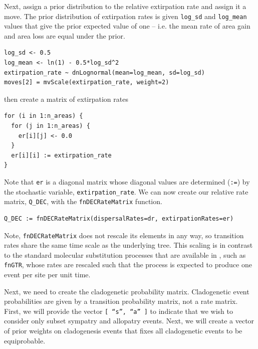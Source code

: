 Next, assign a prior distribution to the relative extirpation rate and assign it a move.
The prior distribution of extirpation rates is given {\tt log\_sd} and {\tt log\_mean} values that give the prior expected value of one -- i.e. the mean rate of area gain and area loss are equal under the prior.

\begin{snugshade}
\begin{lstlisting}
log_sd <- 0.5
log_mean <- ln(1) - 0.5*log_sd^2
extirpation_rate ~ dnLognormal(mean=log_mean, sd=log_sd)
moves[2] = mvScale(extirpation_rate, weight=2)
\end{lstlisting}
\end{snugshade}

then create a matrix of extirpation rates

\begin{snugshade}
\begin{lstlisting}
for (i in 1:n_areas) {
  for (j in 1:n_areas) {
    er[i][j] <- 0.0       
  }
  er[i][i] := extirpation_rate
}
\end{lstlisting}
\end{snugshade}

Note that {\tt er} is a diagonal matrix whose diagonal values are determined ({\tt :=}) by the stochastic variable, {\tt extirpation\_rate}.
We can now create our relative rate matrix, {\tt Q\_DEC}, with the {\tt fnDECRateMatrix} function.

\begin{snugshade}
\begin{lstlisting}
Q_DEC := fnDECRateMatrix(dispersalRates=dr, extirpationRates=er)
\end{lstlisting}
\end{snugshade}

Note, {\tt fnDECRateMatrix} does not rescale its elements in any way, so transition rates share the same time scale as the underlying tree.
This scaling is in contrast to the standard molecular substitution processes that are available in \RevBayes, such as {\tt fnGTR}, whose rates are rescaled such that the process is expected to produce one event per site per unit time.

Next, we need to create the cladogenetic probability matrix.
Cladogenetic event probabilities are given by a transition probability matrix, not a rate matrix.
First, we will provide the vector {\tt [ ``s'', ``a'' ]} to indicate that we wish to consider only subset sympatry and allopatry events.
Next, we will create a vector of prior weights on cladogenesis events that fixes all cladogenetic events to be equiprobable.

